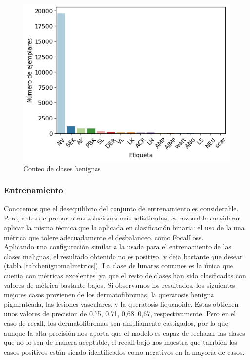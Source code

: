 \begin{figure}[H]
	\centering
	\includegraphics[scale = 0.7]{imagenes/countbenign.png}
	\caption{Conteo de clases benignas}
	\label {fig:buenas}
\end{figure}

\subsubsection{Entrenamiento}

Conocemos que el desequilibrio del conjunto de entrenamiento es considerable. Pero, antes de probar otras soluciones más sofisticadas, es razonable considerar aplicar la misma técnica que la aplicada en clasificación binaria: el uso de la una métrica que tolere adecuadamente el desbalanceo, como FocalLoss.\\

Aplicando una configuración similar a la usada para el entrenamiento de las clases malignas, el resultado obtenido no es positivo, y deja bastante que desear  (tabla \ref{tab:benignomalmetrics}). La clase de lunares comunes es la única que cuenta con métricas excelentes, ya que el resto de clases han sido clasificadas con valores de métrica bastante bajos. Si observamos los resultados,  los siguientes mejores casos provienen de los dermatofibromas, la queratosis benigna pigmenteada,  las lesiones vasculares, y la queratosis liquenoide. Estas obtienen unos valores de precision de 0,75, 0,71, 0,68, 0,67, respectivamente. Pero en el caso de recall, los dermatofibromas son ampliamente castigados, por lo que aunque la alta precisión nos aporta que el modelo es capaz de rechazar las clases que no lo son de manera aceptable, el recall bajo nos muestra que también los casos positivos están siendo identificados como negativos en la mayoría de casos.

